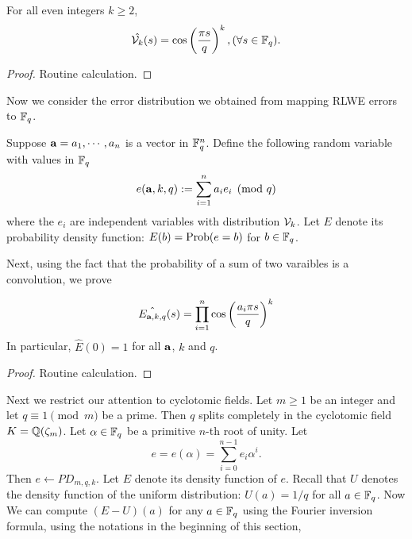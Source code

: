 \documentclass{amsart}
\begin{document}
\begin{Lemma}
For all even integers $k \geq 2$,
$$\hat{\mathcal{V}_k}(s)  = \cos \left(\frac{\pi s}{q}\right)^k, (\forall s \in \mathbb{F}_q).$$
\end{Lemma}

\begin{proof}
Routine calculation.
\end{proof}

Now we consider the error distribution we obtained from mapping RLWE errors to $\mathbb{F}_q$.

\begin{Definition}
Suppose ${\bf a} = a_1, \cdots ,a_n$ is a vector in $\mathbb{F}_q^n$. Define the following random variable with
values in $\mathbb{F}_q$
\[
    e({\bf a}, k, q) := \sum_{i=1}^n a_i e_i \pmod {q}
\]
where the $e_i$ are independent variables with distribution $\mathcal{V}_k$. Let $E$ denote its probability density function:
$E(b) = \operatorname{Prob}(e = b)$ for $b \in \mathbb{F}_q$.
\end{Definition}

Next, using the fact that the probability of a sum of two varaibles is a convolution, we prove
\begin{Lemma}
\[
    \hat{E_{{\bf a}, k, q}}(s) = \prod_{i=1}^{n} \cos \left(\frac{ a_i \pi s}{q} \right)^k
\]
In particular, $\hat{E}(0) = 1$ for all ${\bf a}$, $k$ and $q$.
\end{Lemma}

\begin{proof}
Routine calculation.
\end{proof}






Next we restrict our attention to cyclotomic fields. Let
$m \geq 1$ be an integer and let $q \equiv 1 \pmod{m}$ be a prime. Then $q$ splits completely in the cyclotomic field $K = \mathbb{Q}(\zeta_m)$. Let $\alpha \in \mathbb{F}_q$ be a primitive $n$-th root of unity. Let
\[
    e = e(\alpha) = \sum_{i=0}^{n-1} e_i \alpha^i.
\]
Then $e \gets PD_{m,q,k}$. Let $E$ denote its density function of $e$. Recall that $U$ denotes the density function of the uniform distribution: $U(a) = 1/q$ for all $a \in \mathbb{F}_q$. Now We can compute $(E - U)(a)$ for any $a \in \mathbb{F}_q$ using the Fourier inversion formula, using the notations in the beginning of this section,
\end{document}
